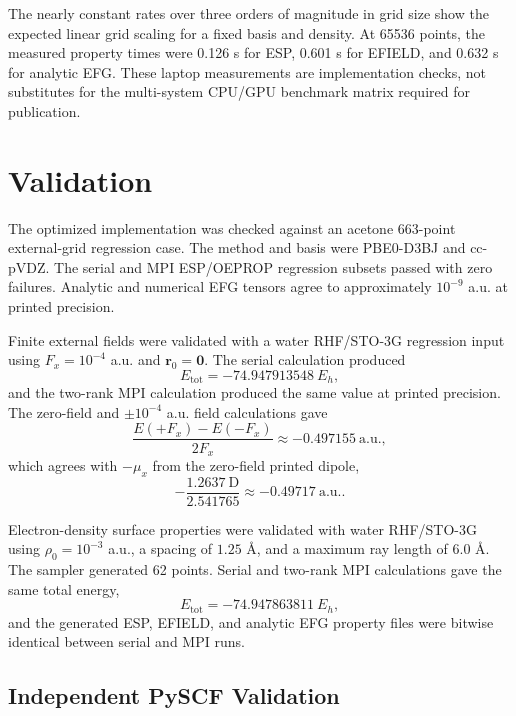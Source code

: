 \documentclass[journal=jcisd8,manuscript=suppinfo]{achemso}
\begin{document}
The nearly constant rates over three orders of magnitude in grid size show the expected linear grid scaling for a fixed basis and density.  At 65536 points, the measured property times were 0.126 s for ESP, 0.601 s for EFIELD, and 0.632 s for analytic EFG.  These laptop measurements are implementation checks, not substitutes for the multi-system CPU/GPU benchmark matrix required for publication.

\section{Validation}

The optimized implementation was checked against an acetone 663-point external-grid regression case.  The method and basis were PBE0-D3BJ and cc-pVDZ.  The serial and MPI ESP/OEPROP regression subsets passed with zero failures.  Analytic and numerical EFG tensors agree to approximately \(10^{-9}\) a.u. at printed precision.

Finite external fields were validated with a water RHF/STO-3G regression input using \(F_x=10^{-4}\) a.u. and \(\mathbf{r}_0=\mathbf{0}\).  The serial calculation produced
\begin{equation}
  E_{\mathrm{tot}}=-74.947913548~E_h,
\end{equation}
and the two-rank MPI calculation produced the same value at printed precision.  The zero-field and \(\pm 10^{-4}\) a.u. field calculations gave
\begin{equation}
  \frac{E(+F_x)-E(-F_x)}{2F_x}
  \approx -0.497155~\mathrm{a.u.},
\end{equation}
which agrees with \(-\mu_x\) from the zero-field printed dipole,
\begin{equation}
  -\frac{1.2637~\mathrm{D}}{2.541765}
  \approx -0.49717~\mathrm{a.u.}.
\end{equation}

Electron-density surface properties were validated with water RHF/STO-3G using \(\rho_0=10^{-3}\) a.u., a spacing of \(1.25\) \AA, and a maximum ray length of \(6.0\) \AA.  The sampler generated 62 points.  Serial and two-rank MPI calculations gave the same total energy,
\begin{equation}
  E_{\mathrm{tot}}=-74.947863811~E_h,
\end{equation}
and the generated ESP, EFIELD, and analytic EFG property files were bitwise identical between serial and MPI runs.

\subsection{Independent PySCF Validation}
\end{document}
